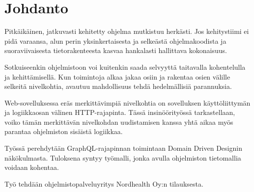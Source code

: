\hypertarget{johdanto}{%
\chapter{Johdanto}\label{johdanto}}

Pitkäikäinen, jatkuvasti kehitetty ohjelma mutkistuu herkästi. Jos
kehitystiimi ei pidä varaansa, alun perin yksinkertaisesta ja selkeästä
ohjelmakoodista ja suoraviivaisesta tietorakenteesta kasvaa hankalasti
hallittava kokonaisuus.

Sotkuiseenkin ohjelmistoon voi kuitenkin saada selvyyttä taitavalla
kohentelulla ja kehittämisellä. Kun toimintoja alkaa jakaa osiin ja
rakentaa osien välille selkeitä nivelkohtia, avautuu mahdollisuus tehdä
hedelmällisiä parannuksia.

Web-sovelluksessa eräs merkittävimpiä nivelkohtia on sovelluksen
käyttöliittymän ja logiikkaosan välinen HTTP-rajapinta. Tässä
insinöörityössä tarkastellaan, voiko tämän merkittävän nivelkohdan
uudistamisen kanssa yhtä aikaa myös parantaa ohjelmiston sisäistä
logiikkaa.

Työssä perehdytään GraphQL-rajapinnan toimintaan Domain Driven Designin
näkökulmasta. Tuloksena syntyy työmalli, jonka avulla ohjelmiston
tietomallia voidaan kohentaa.

Työ tehdään ohjelmistopalveluyritys Nordhealth Oy:n tilauksesta.
